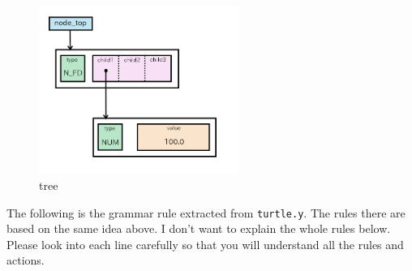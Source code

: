 \begin{figure}
\centering
\includegraphics[width=6.51cm,height=5.46cm]{../image/tree.png}
\caption{tree}
\end{figure}

The following is the grammar rule extracted from
\passthrough{\lstinline!turtle.y!}. The rules there are based on the
same idea above. I don't want to explain the whole rules below. Please
look into each line carefully so that you will understand all the rules
and actions.

